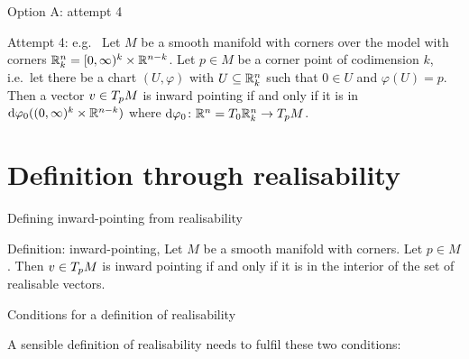 \documentclass{beamer}
\begin{document}
\begin{frame}{Option A: attempt 4}

\begin{block}{Attempt 4: e.g.\ \cite{Joyce2009}}
    Let $M$ be a smooth manifold with corners over \alert<2>{the model with corners $\mathbb{R}^n_k = [0, \infty)^k \times \mathbb{R}^{n - k}$}. 
    Let $p \in M$ be a corner point of codimension $k$, i.e.\ let there be a chart $(U, \varphi)$ with $U \subseteq \mathbb{R}^n_k$ such that $0 \in U$ and $\varphi(U) = p$. 
    Then a vector $v \in T_{p}M$ is inward pointing if and only if it is in $\text{d}\varphi_{0} ((0, \infty)^k \times \mathbb{R}^{n - k})$ where $\text{d}\varphi_{0} \colon \mathbb{R}^n = T_{0}\mathbb{R}^n_k \to T_{p}M$.
\end{block}

\end{frame}

\section{Definition through realisability}

\begin{frame}{Defining inward-pointing from realisability}

\begin{block}{Definition: inward-pointing, \cite{Amr2021}}
    Let $M$ be a smooth manifold with corners. Let $p \in M$. Then $v \in T_{p}M$ is inward pointing if and only if it is in the interior of the set of realisable vectors. 
\end{block}

\end{frame}

\begin{frame}{Conditions for a definition of realisability}

A sensible definition of realisability needs to fulfil these two conditions: 

\end{frame}
\end{document}
